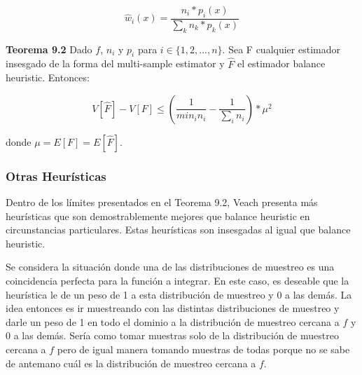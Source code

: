 \documentclass{article}
\begin{document}
$$ \hat{w}_{i}(x) = \frac{n_{i} * p_{i}(x)}{\sum_{k} n_{k} * p_{k}(x)}$$

\textbf{Teorema 9.2} Dado $f$, $n_{i}$ y $p_{i}$ para $i \in \{1, 2, ..., n\}$. Sea F cualquier estimador insesgado de la forma del multi-sample estimator y $\hat{F}$ el estimador balance heuristic. Entonces:

$$V[\hat{F}] - V[F] \leq ( \frac{1}{min_{i} n_{i}} - \frac{1}{\sum_{i} n_{i}} ) * \mu^{2}$$

donde $\mu = E[F] = E[\hat{F}]$.









\subsubsection{Otras Heurísticas}

Dentro de los límites presentados en el Teorema 9.2, Veach presenta más heurísticas que son demostrablemente mejores que balance heuristic en circunstancias particulares.
Estas heurísticas son insesgadas al igual que balance heuristic.

Se considera la situación donde una de las distribuciones de muestreo es una coincidencia perfecta para la función a integrar. En este caso, es deseable que la heurística le de un peso de 1 a esta distribución de muestreo y 0 a las demás.
La idea entonces es ir muestreando con las distintas distribuciones de muestreo y darle un peso de 1 en todo el dominio a la distribución de muestreo cercana a $f$ y 0 a las demás.
Sería como tomar muestras solo de la distribución de muestreo cercana a $f$ pero de igual manera tomando muestras de todas porque no se sabe de antemano cuál es la distribución de muestreo cercana a $f$.
\end{document}
